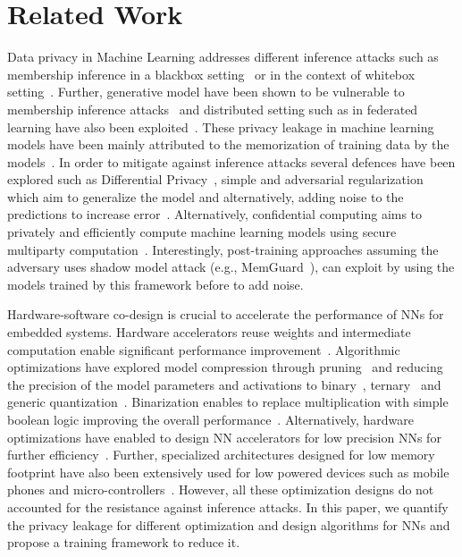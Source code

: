 \section{Related Work}\label{related}

Data privacy in Machine Learning addresses different inference attacks such as membership inference in a blackbox setting~\cite{salem2018ml,shokri2017membership} or in the context of whitebox setting~\cite{DBLP:journals/corr/abs-1812-00910}.
Further, generative model have been shown to be vulnerable to membership inference attacks~\cite{LOGANMembershipInferenceAttacksAgainstGenerativeModels} and distributed setting such as in federated learning have also been exploited~\cite{melis2019exploiting,DBLP:journals/corr/abs-1812-00910}.
These privacy leakage in machine learning models have been mainly attributed to the memorization of training data by the models~\cite{236216,10.1145/3133956.3134077}.
In order to mitigate against inference attacks several defences have been explored such as Differential Privacy~\cite{Abadi:2016:DLD:2976749.2978318}, simple and adversarial regularization~\cite{DBLP:conf/ccs/NasrSH18,salem2018ml} which aim to generalize the model and alternatively, adding noise to the predictions to increase error~\cite{10.1145/3319535.3363201}.
Alternatively, confidential computing aims to privately and efficiently compute machine learning models using secure multiparty computation~\cite{235489}.
Interestingly, post-training approaches assuming the adversary uses shadow model attack (e.g., MemGuard~\cite{10.1145/3319535.3363201}), can exploit \method\hspace{0.02in} by using the models trained by this framework before to add noise.

Hardware-software co-design is crucial to accelerate the performance of NNs for embedded systems.
Hardware accelerators reuse weights and intermediate computation enable significant performance improvement~\cite{10.1109/ISCA.2016.30}.
Algorithmic optimizations have explored model compression through pruning~\cite{Han:2015:LBW:2969239.2969366} and reducing the precision of the model parameters and activations to binary~\cite{NIPS2016_6573}, ternary~\cite{Li2016TernaryWN} and generic quantization~\cite{Hubara:2017:QNN:3122009.3242044}.
Binarization enables to replace multiplication with simple boolean logic improving the overall performance~\cite{rastegari2016xnornet}.
Alternatively, hardware optimizations have enabled to design NN accelerators for low precision NNs for further efficiency~\cite{Umuroglu2017FINNAF}.
Further, specialized architectures designed for low memory footprint have also been extensively used for low powered devices such as mobile phones and micro-controllers~\cite{DBLP:journals/corr/IandolaMAHDK16,conf/cvpr/SandlerHZZC18}. 
However, all these optimization designs do not accounted for the resistance against inference attacks.
In this paper, we quantify the privacy leakage for different optimization and design algorithms for NNs and propose a training framework to reduce it.


